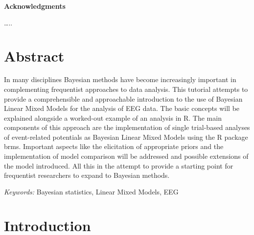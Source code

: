 \documentclass[
  doc,12pt,floatsintext]{apa7}
\begin{document}
\clearpage

\mbox{}\thispagestyle{empty}\clearpage

\newpage

\thispagestyle{empty}

\vspace*{55mm}

\begin{center}\textbf{Acknowledgments}\end{center}

\ldots..

\clearpage

\mbox{}\thispagestyle{empty}\clearpage

\thispagestyle{empty}

\vspace*{10mm}

\begin{flushleft}
{
\tableofcontents
}
\end{flushleft}

\newpage

\setcounter{page}{5}

\section*{Abstract}\label{abstract}

\noindent In many disciplines Bayesian methods have become increasingly important in complementing frequentist approaches to data analysis. This tutorial attempts to provide a comprehensible and approachable introduction to the use of Bayesian Linear Mixed Models for the analysis of EEG data. The basic concepts will be explained alongside a worked-out example of an analysis in R. The main components of this approach are the implementation of single trial-based analyses of event-related potentials as Bayesian Linear Mixed Models using the R package brms. Important aspects like the elicitation of appropriate priors and the implementation of model comparison will be addressed and possible extensions of the model introduced. All this in the attempt to provide a starting point for frequentist researchers to expand to Bayesian methods.

\emph{Keywords:} Bayesian statistics, Linear Mixed Models, EEG

\newpage

\section{Introduction}\label{introduction}
\end{document}
